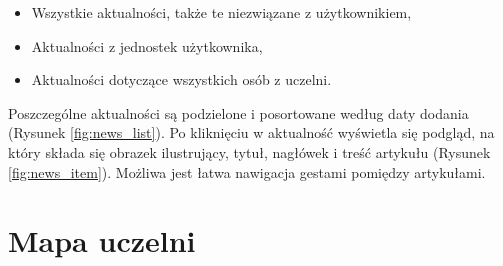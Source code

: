 \documentclass{pracamgr}
\begin{document}
\begin{itemize}
	\item Wszystkie aktualności, także te niezwiązane z użytkownikiem,
	\item Aktualności z jednostek użytkownika,
	\item Aktualności dotyczące wszystkich osób z uczelni.
\end{itemize}

Poszczególne aktualności są podzielone i posortowane według daty dodania (Rysunek \ref{fig:news_list}). Po
kliknięciu w aktualność wyświetla się podgląd, na który składa się obrazek ilustrujący,
tytuł, nagłówek i treść artykułu (Rysunek \ref{fig:news_item}). Możliwa jest łatwa nawigacja gestami pomiędzy
artykułami.

\section{Mapa uczelni}
\end{document}
